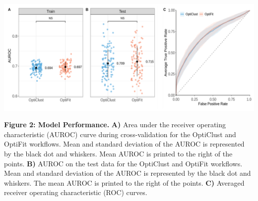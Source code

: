 \documentclass[
]{article}
\begin{document}
\includegraphics{figures/fig2.png}

\textbf{Figure 2: Model Performance.} \textbf{A)} Area under the
receiver operating characteristic (AUROC) curve during cross-validation
for the OptiClust and OptiFit workflows. Mean and standard deviation of
the AUROC is represented by the black dot and whiskers. Mean AUROC is
printed to the right of the points. \textbf{B)} AUROC on the test data
for the OptiClust and OptiFit workflows. Mean and standard deviation of
the AUROC is represented by the black dot and whiskers. The mean AUROC
is printed to the right of the points. \textbf{C)} Averaged receiver
operating characteristic (ROC) curves.
\end{document}
